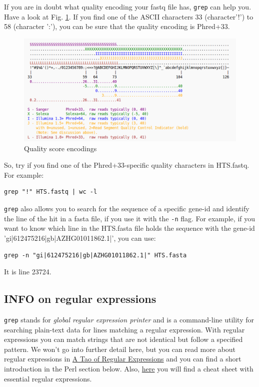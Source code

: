 \documentclass[11pt]{article}
\begin{document}
If you are in doubt what quality encoding your fastq file has, \texttt{grep}
can help you. Have a look at Fig. \ref{Fig:QC}. If you find one of the ASCII
characters 33 (character'!') to 58 (character ':'), you can be sure
that the quality encoding is Phred+33. 


\begin{figure}[htb]
\centering
\includegraphics[width=14cm]{Fastq.png}
\caption{\label{Fig:QC}Quality score encodings}
\end{figure}


So, try if you find one of the Phred+33-specific quality characters in
HTS.fastq. For example:

\begin{verbatim}
grep "!" HTS.fastq | wc -l
\end{verbatim}



\texttt{grep} also allows you to search for the sequence of a specific
gene-id and identify the line of the hit in a fasta file, if you use
it with the \texttt{-n} flag. For example, if you want to know which line
in the HTS.fasta file holds the sequence with the gene-id
'gi|612475216|gb|AZHG01011862.1|', you can use:

\begin{verbatim}
grep -n "gi|612475216|gb|AZHG01011862.1|" HTS.fasta
\end{verbatim}

It is line 23724.

\subsection{INFO on regular expressions}
\label{sec-4-3}

\texttt{grep} stands for \emph{global regular expression printer} and is a
command-line utility for searching plain-text data for lines matching
a regular expression. With regular expressions you can match strings
that are not identical but follow a specified pattern.  We won't
go into further detail here, but you can read more about regular
expressions in \href{http://www.scootersoftware.com/RegEx.html}{A Tao of Regular Expressions} and you can find a 
short introduction in the Perl section below. Also, \href{http://www.cheatography.com/davechild/cheat-sheets/regular-expressions/}{here} you will find
a cheat sheet with essential regular expressions.
\end{document}
